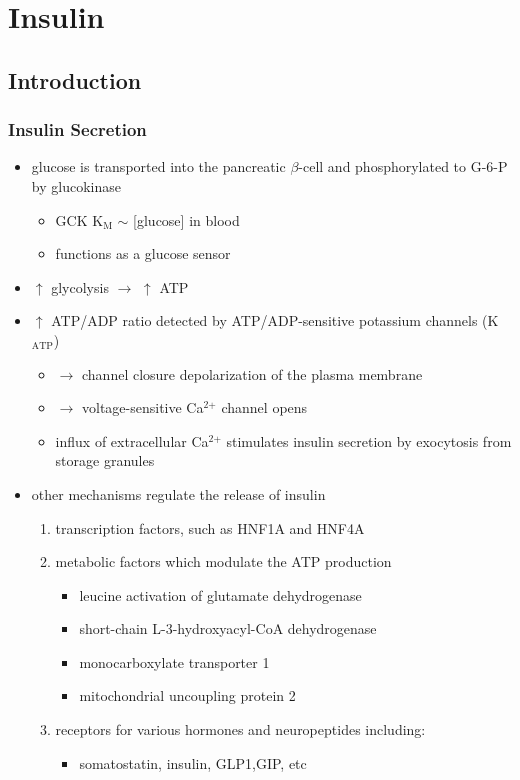 \documentclass{scrartcl}
\begin{document}
\section{Insulin}
\label{sec:org708e541}
\subsection{Introduction}
\label{sec:org1c08b6f}
\subsubsection{Insulin Secretion}
\label{sec:org92f3e05}
\begin{itemize}
\item glucose is transported into the pancreatic \(\beta\)-cell and phosphorylated to G-6-P by glucokinase
\begin{itemize}
\item GCK K\(_{\text{M}}\) \(\sim\) [glucose] in blood
\item functions as a glucose sensor
\end{itemize}
\item \(\uparrow\) glycolysis \(\to\) \(\uparrow\) ATP
\item \(\uparrow\) ATP/ADP ratio detected by ATP/ADP-sensitive potassium channels (K\(_{\text{ATP}}\))
\begin{itemize}
\item \(\to\) channel closure depolarization of the plasma membrane
\item \(\to\) voltage-sensitive Ca\(^{\text{2+}}\) channel opens
\item influx of extracellular Ca\(^{\text{2+}}\) stimulates insulin secretion by
exocytosis from storage granules
\end{itemize}

\item other mechanisms regulate the release of insulin
\begin{enumerate}
\item transcription factors, such as HNF1A and HNF4A
\item metabolic factors which modulate the ATP production
\begin{itemize}
\item leucine activation of glutamate dehydrogenase
\item short-chain L-3-hydroxyacyl-CoA dehydrogenase
\item monocarboxylate transporter 1
\item mitochondrial uncoupling protein 2
\end{itemize}
\item receptors for various hormones and neuropeptides including:
\begin{itemize}
\item somatostatin, insulin, GLP1,GIP, etc
\end{itemize}
\end{enumerate}
\end{itemize}
\end{document}

